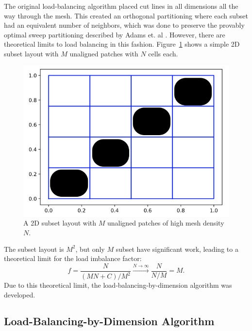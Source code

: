 \documentclass[times,final]{elsarticle}
\begin{document}
The original load-balancing algorithm placed cut lines in all dimensions all the way through the mesh.
This created an orthogonal partitioning where each subset had an equivalent number of neighbors, which was done to preserve the provably optimal sweep partitioning described by Adams et. al \cite{mpadams2013,mpadams2015,mpadamsjcp}.
However, there are theoretical limits to load balancing in this fashion. Figure~\ref{2dgeneral} shows a simple 2D subset layout with $M$ unaligned patches with $N$ cells each.

\begin{figure}[H]
\centering
\includegraphics[scale=0.4]{../figures/theoretical_plot.png}
 \caption{A 2D subset layout with $M$ unaligned patches of high mesh density $N$.}
\label{2dgeneral}
\end{figure}
The subset layout is $M^2$, but only $M$ subset have significant work, leading to a theoretical limit for the load imbalance factor:
\begin{equation}
f= \frac{N}{(MN+C)/M^2} \xrightarrow{N\to \infty} \frac{N}{N/M} = M.
\end{equation}
Due to this theoretical limit, the load-balancing-by-dimension algorithm was developed.

\subsection{Load-Balancing-by-Dimension Algorithm}
\label{sec:lbd}
\end{document}
